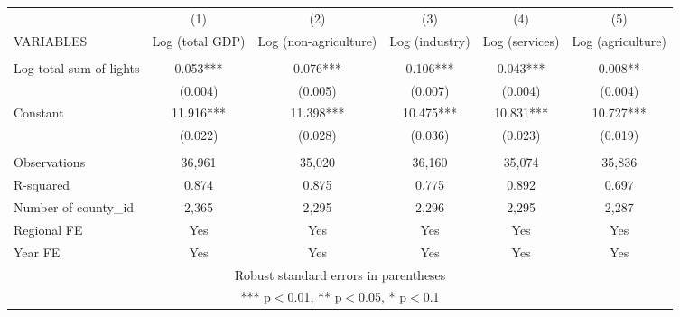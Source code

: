 \documentclass[]{article}
\begin{document}
\begin{tabular}{lccccc} \hline
 & (1) & (2) & (3) & (4) & (5) \\
VARIABLES & Log (total GDP) & Log (non-agriculture) & Log (industry) & Log (services) & Log (agriculture) \\ \hline
 &  &  &  &  &  \\
Log total sum of lights & 0.053*** & 0.076*** & 0.106*** & 0.043*** & 0.008** \\
 & (0.004) & (0.005) & (0.007) & (0.004) & (0.004) \\
Constant & 11.916*** & 11.398*** & 10.475*** & 10.831*** & 10.727*** \\
 & (0.022) & (0.028) & (0.036) & (0.023) & (0.019) \\
 &  &  &  &  &  \\
Observations & 36,961 & 35,020 & 36,160 & 35,074 & 35,836 \\
R-squared & 0.874 & 0.875 & 0.775 & 0.892 & 0.697 \\
Number of county\_id & 2,365 & 2,295 & 2,296 & 2,295 & 2,287 \\
Regional FE & Yes & Yes & Yes & Yes & Yes \\
 Year FE & Yes & Yes & Yes & Yes & Yes \\ \hline
\multicolumn{6}{c}{ Robust standard errors in parentheses} \\
\multicolumn{6}{c}{ *** p$<$0.01, ** p$<$0.05, * p$<$0.1} \\
\end{tabular}
\end{document}
